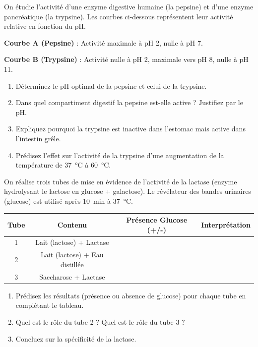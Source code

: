 \documentclass[11pt]{article}
\begin{document}
\begin{exercice}
On étudie l'activité d'une enzyme digestive humaine (la pepsine) et d'une enzyme pancréatique (la trypsine). Les courbes ci-dessous représentent leur activité relative en fonction du pH.
\vspace{0.5cm}
\noindent\begin{minipage}{0.48\linewidth}
\textbf{Courbe A (Pepsine)} : Activité maximale à pH 2, nulle à pH 7.
\end{minipage}
\hfill
\begin{minipage}{0.48\linewidth}
\textbf{Courbe B (Trypsine)} : Activité nulle à pH 2, maximale vers pH 8, nulle à pH 11.
\end{minipage}
\vspace{0.5cm}
\begin{enumerate}
    \item Déterminez le pH optimal de la pepsine et celui de la trypsine.
    \item Dans quel compartiment digestif la pepsine est-elle active ? Justifiez par le pH.
    \item Expliquez pourquoi la trypsine est inactive dans l'estomac mais active dans l'intestin grêle.
    \item Prédisez l'effet sur l'activité de la trypsine d'une augmentation de la température de \SI{37}{\celsius} à \SI{60}{\celsius}.
\end{enumerate}
\end{exercice}

\begin{exercice}
On réalise trois tubes de mise en évidence de l'activité de la lactase (enzyme hydrolysant le lactose en glucose + galactose). Le révélateur des bandes urinaires (glucose) est utilisé après \SI{10}{\minute} à \SI{37}{\celsius}.
\begin{center}
\begin{tabular}{|c|c|c|c|}
\hline
\textbf{Tube} & \textbf{Contenu} & \textbf{Présence Glucose (+/-)} & \textbf{Interprétation} \\ \hline
1 & Lait (lactose) + Lactase &  &  \\ \hline
2 & Lait (lactose) + Eau distillée &  &  \\ \hline
3 & Saccharose + Lactase &  &  \\ \hline
\end{tabular}
\end{center}
\begin{enumerate}
    \item Prédisez les résultats (présence ou absence de glucose) pour chaque tube en complétant le tableau.
    \item Quel est le rôle du tube 2 ? Quel est le rôle du tube 3 ?
    \item Concluez sur la spécificité de la lactase.
\end{enumerate}
\end{exercice}
\end{document}
